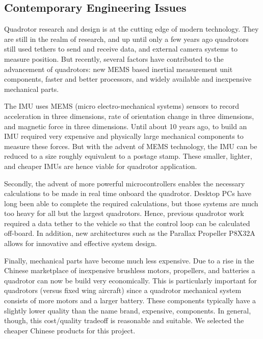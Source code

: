 \documentclass{article}
\numberwithin{equation}{section} %
\begin{document}
\subsection{Contemporary Engineering Issues}

Quadrotor research and design is at the cutting edge of modern technology. They are still in the realm of research, and up until only a few years ago quadrotors still used tethers to send and receive data, and external camera systems to measure position. But recently, several factors have contributed to the advancement of quadrotors: new MEMS based inertial measurement unit components, faster and better processors, and widely available and inexpensive mechanical parts.

The IMU uses MEMS (micro electro-mechanical systems) sensors to record acceleration in three dimensions, rate of orientation change in three dimensions, and magnetic force in three dimensions. Until about 10 years ago, to build an IMU required very expensive and physically large mechanical components to measure these forces. But with the advent of MEMS technology, the IMU can be reduced to a size roughly equivalent to a postage stamp. These smaller, lighter, and cheaper IMUs are hence viable for quadrotor application.

Secondly, the advent of more powerful microcontrollers enables the necessary calculations to be made in real time onboard the quadrotor. Desktop PCs have long been able to complete the required calculations, but those systems are much too heavy for all but the largest quadrotors. Hence, previous quadrotor work required a data tether to the vehicle so that the control loop can be calculated off-board. In addition, new architectures such as the Parallax Propeller P8X32A allows for innovative and effective system design.

Finally, mechanical parts have become much less expensive. Due to a rise in the Chinese marketplace of inexpensive brushless motors, propellers, and batteries a quadrotor can now be build very economically. This is particularly important for quadrotors (versus fixed wing aircraft) since a quadrotor mechanical system consists of more motors and a larger battery. These components typically have a slightly lower quality than the name brand, expensive, components. In general, though, this cost/quality tradeoff is reasonable and suitable. We selected the cheaper Chinese products for this project.
\end{document}
